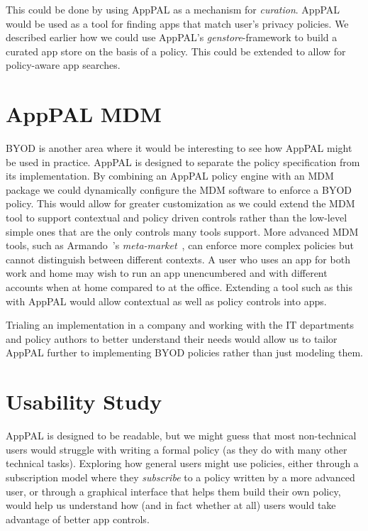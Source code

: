 \documentclass[thesis.tex]{subfiles}
\begin{document}
This could be done by using AppPAL as a mechanism for \emph{curation}. AppPAL
would be used as a tool for finding apps that match user's privacy policies. We
described earlier how we could use AppPAL's \emph{genstore}-framework to build a
curated app store on the basis of a policy. This could be extended to allow for
policy-aware app searches.

\section{AppPAL MDM}

BYOD is another area where it would be interesting to see how AppPAL might be
used in practice. AppPAL is designed to separate the policy specification from
its implementation. By combining an AppPAL policy engine with an MDM package we
could dynamically configure the MDM software to enforce a BYOD policy. This
would allow for greater customization as we could extend the MDM tool to support
contextual and policy driven controls rather than the low-level simple ones that
are the only controls many tools support. More advanced MDM tools, such as
Armando~\etal's \emph{meta-market}~\cite{armando_enabling_2014}, can enforce
more complex policies but cannot distinguish between different contexts. A user
who uses an app for both work and home may wish to run an app unencumbered and
with different accounts when at home compared to at the office. Extending a tool
such as this with AppPAL would allow contextual as well as policy controls into
apps.

Trialing an implementation in a company and working with the IT departments and
policy authors to better understand their needs would allow us to tailor AppPAL
further to implementing BYOD policies rather than just modeling them.

\section{Usability Study}

AppPAL is designed to be readable, but we might guess that most non-technical
users would struggle with writing a formal policy (as they do with many other
technical tasks). Exploring how general users might use policies, either through
a subscription model where they \emph{subscribe} to a policy written by a more
advanced user, or through a graphical interface that helps them build their own
policy, would help us understand how (and in fact whether at all) users would
take advantage of better app controls.
\end{document}
